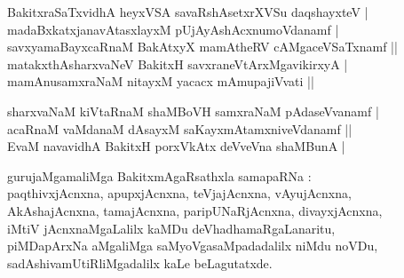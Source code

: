 \begin{entry}
\begin{shl}
BakitxraSaTxvidhA heyxVSA savaRshAsetxrXVSu daqshayxteV |\\
madaBxkatxjanavAtasxlayxM pUjAyAshAcxnumoVdanamf |\\
savxyamaBayxcaRnaM BakAtxyX mamAtheRV cAMgaceVSaTxnamf ||\\
matakxthAsharxvaNeV BakitxH savxraneVtArxMgavikirxyA |\\
mamAnusamxraNaM nitayxM yacacx mAmupajiVvati ||
\end{shl}
\begin{shl}
sharxvaNaM kiVtaRnaM shaMBoVH samxraNaM pAdaseVvanamf |\\
acaRnaM vaMdanaM dAsayxM saKayxmAtamxniveVdanamf ||\\
EvaM navavidhA BakitxH porxVkAtx deVveVna shaMBunA | 
\end{shl}
\end{entry}

\begin{entry}
\begin{shl}
gurujaMgamaliMga BakitxmAgaRsathxla samapaRNa :\\
paqthivxjAcnxna, apupxjAcnxna, teVjajAcnxna, vAyujAcnxna,\\
AkAshajAcnxna, tamajAcnxna, paripUNaRjAcnxna, divayxjAcnxna,\\
iMtiV jAcnxnaMgaLalilx kaMDu deVhadhamaRgaLanaritu,\\
piMDapArxNa aMgaliMga saMyoVgasaMpadadalilx niMdu noVDu,\\
sadAshivamUtiRliMgadalilx kaLe beLagutatxde.
\end{shl}
\end{entry}

\begin{entry}
\gl{}
\end{entry}

\begin{entry}
\end{entry}

